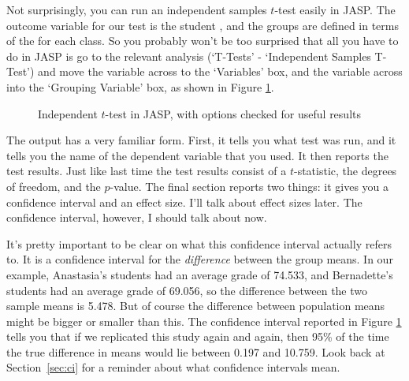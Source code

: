 
Not surprisingly, you can run an independent samples $t$-test easily in JASP. The outcome variable for our test is the student , and the groups are defined in terms of the  for each class. So you probably won't be too surprised that all you have to do in JASP is go to the relevant analysis (`T-Tests' - `Independent Samples T-Test') and move the  variable across to the `Variables' box, and the  variable across into the `Grouping Variable' box, as shown in Figure \ref{fig:ttest_ind}.

\begin{figure}[htb]
\begin{center}
\caption{Independent $t$-test in JASP, with options checked for useful results}
\HR
\label{fig:ttest_ind}
\end{center}
\end{figure}

The output has a very familiar form. First, it tells you what test was run, and it tells you the name of the dependent variable that you used. It then reports the test results. Just like last time the test results consist of a $t$-statistic, the degrees of freedom, and the $p$-value. The final section reports two things: it gives you a confidence interval and an effect size. I'll talk about effect sizes later. The confidence interval, however, I should talk about now. 

It's pretty important to be clear on what this confidence interval actually refers to. It is a confidence interval for the {\it difference} between the group means. In our example, Anastasia's students had an average grade of 74.533, and Bernadette's students had an average grade of 69.056, so the difference between the two sample means is 5.478. But of course the difference between population means might be bigger or smaller than this. The confidence interval reported in Figure \ref{fig:ttest_ind} tells you that if we replicated this study again and again, then 95\% of the time the true difference in means would lie between 0.197 and 10.759. Look back at Section~\ref{sec:ci} for a reminder about what confidence intervals mean.  

